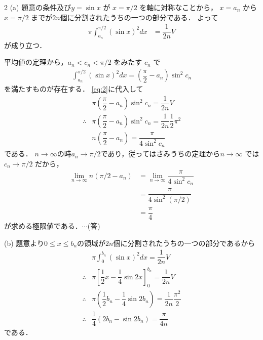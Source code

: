 \documentclass[../../main.tex]{subfiles}
\begin{document}
\begin{multicols}{2}
  (a)
  題意の条件及び$y = \sin x$ が $x = \pi/2$ を軸に対称なことから，
  $x=a_n$ から $x = \pi/2$ までが$2n$個に分割されたうちの一つの部分である．
  よって
  \begin{align}
    \pi \int_{a_n}^{\pi/2} (\sin x)^2 dx & = \dfrac{1}{2n}V \label{eq:3}
  \end{align}
  が成り立つ．

  平均値の定理から，$a_n < c_n < \pi/2$ をみたす $c_n$ で
  \begin{align}
    \int_{a_n}^{\pi/2} (\sin x)^2 dx = \left(\dfrac{\pi}{2}-a_n\right)\sin^2 c_n
  \end{align}
  を満たすものが存在する．
  \cref{eq:2}に代入して
  \begin{align}
    & \pi \left(\dfrac{\pi}{2} - a_n\right) \sin^2 c_n  = \dfrac{1}{2n}V                 \\
    \therefore
    & \pi \left(\dfrac{\pi}{2} - a_n\right) \sin^2 c_n  = \dfrac{1}{2n} \dfrac{1}{2}\pi^2 \\
    & n \left(\dfrac{\pi}{2} - a_n\right)   = \dfrac{\pi}{4\sin^2 c_n}
  \end{align}
  である．
  $n \to \infty$の時$a_n \to \pi/2$であり，従ってはさみうちの定理から$n \to \infty$ では $c_n \to \pi/2$ だから，
  \begin{align}
    \lim_{n \to \infty} n(\pi/2 - a_n)
    & = \lim_{n \to \infty} \dfrac{\pi}{4 \sin^2 c_n} \\
    & = \dfrac{\pi}{4 \sin^2(\pi/2)}                  \\
    & = \dfrac{\pi}{4}
  \end{align}
  が求める極限値である．$\cdots$(答)

  (b) 題意より$0 \le x \le b_n$の領域が$2n$個に分割されたうちの一つの部分であるから
  \begin{align}
    & \pi \int_0^{b_n} (\sin x)^2 dx                                = \dfrac{1}{2n}V                        \\
    \therefore
    & \pi \left[ \dfrac{1}{2}x - \dfrac{1}{4}\sin 2x \right]_0^{b_n}  = \dfrac{1}{2n}V                        \\
    \therefore
    & \pi \left( \dfrac{1}{2}b_n - \dfrac{1}{4}\sin 2b_n \right)      = \dfrac{1}{2n} \dfrac{\pi^2}{2}         \\
    \therefore
    & \dfrac{1}{4}\left(2b_n - \sin 2b_n\right)                        = \dfrac{\pi}{4n} \label{eq:4}
  \end{align}
  である．


\end{multicols}
\end{document}
